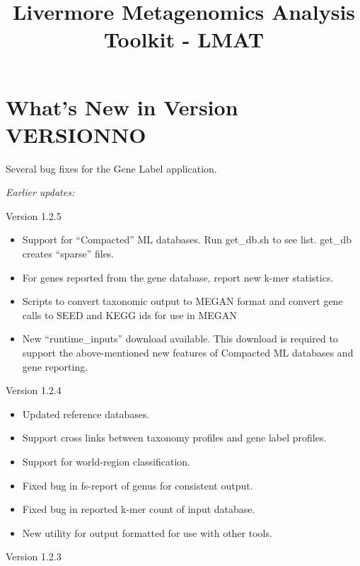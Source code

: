 \documentclass[11pt]{article}
\title{Livermore Metagenomics Analysis Toolkit - LMAT}
\newcommand{\lmatver}{VERSIONNO}
\begin{document}
\maketitle
\tableofcontents

\section{What's New in Version \lmatver}

Several bug fixes for the Gene Label application.

{\it Earlier updates:}

Version 1.2.5

\begin{itemize}
\item
Support for ``Compacted'' ML databases.  Run get\_db.sh to see list. get_db creates ``sparse'' files.
\item
For genes reported from the gene database, report new k-mer statistics.
\item
Scripts to convert taxonomic output to MEGAN format and convert gene calls to SEED and KEGG ids for use in MEGAN
\item
New ``runtime\_inputs'' download available.  This download is required to support the above-mentioned new features of Compacted ML databases and gene reporting.

\end{itemize}


Version 1.2.4


\begin{itemize}
\item
Updated reference databases.
\item
Support cross links between taxonomy profiles and gene label profiles.

\item
Support for world-region classification.
\item
Fixed bug in fs-report of genus for consistent output.

\item
Fixed bug in reported k-mer count of input database.
\item
New utility for output formatted for use with other tools.

\end{itemize}


Version 1.2.3
\end{document}

